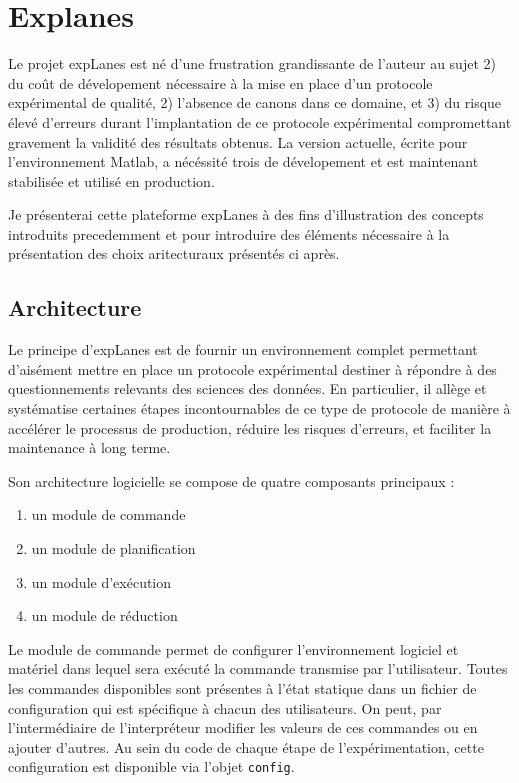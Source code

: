 \section{ \nmu Explanes} \label{sec:explanes}

Le projet expLanes est né d'une frustration grandissante de l'auteur au sujet 2) du coût de dévelopement nécessaire à la mise en place d'un protocole expérimental de qualité, 2) l'absence de canons dans ce domaine, et 3) du risque élevé d'erreurs durant l'implantation de ce protocole expérimental compromettant gravement la validité des résultats obtenus. La version actuelle, écrite pour l'environnement Matlab, a nécéssité trois de dévelopement et est maintenant stabilisée et utilisé en production.

Je présenterai cette plateforme expLanes à des fins d'illustration des concepts introduits precedemment et pour introduire des éléments nécessaire à la présentation des choix aritecturaux présentés ci après.

\subsection{Architecture}

Le principe d'expLanes est de fournir un environnement complet permettant d'aisément mettre en place un protocole expérimental destiner à répondre à des questionnements relevants des sciences des données. En particulier, il allège et systématise certaines étapes incontournables de ce type de protocole de manière à accélérer le processus de production, réduire les risques d'erreurs, et faciliter la maintenance à long terme.

Son architecture logicielle se compose de quatre composants principaux :
\begin{enumerate}
  \item un module de commande
  \item un module de planification
  \item un module d'exécution
  \item un module de réduction
\end{enumerate}

Le module de commande permet de configurer l'environnement logiciel et matériel dans lequel sera exécuté la commande transmise par l'utilisateur. Toutes les commandes disponibles sont présentes à l'état statique dans un fichier de configuration qui est spécifique à chacun des utilisateurs. On peut, par l'intermédiaire de l'interpréteur modifier les valeurs de ces commandes ou en ajouter d'autres. Au sein du code de chaque étape de l'expérimentation, cette configuration est disponible via l'objet \texttt{config}.

